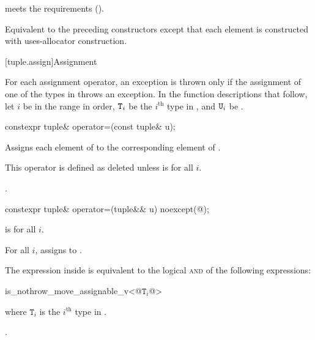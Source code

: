 \documentclass{wg21}
\begin{document}
\begin{itemdescr}
    \pnum
    \expects
     meets the
     requirements ().

    \pnum
    \effects
    Equivalent to the preceding constructors except that each element is constructed with
    uses-allocator construction.
\end{itemdescr}

[tuple.assign]{Assignment}

\pnum
For each  assignment operator, an exception is thrown only if the
assignment of one of the types in  throws an exception.
In the function descriptions that follow, let $i$ be in the range 
in order, $\texttt{T}_i$ be the $i^\text{th}$ type in ,
and $\texttt{U}_i$ be .

%
\begin{itemdecl}
    constexpr tuple& operator=(const tuple& u);
\end{itemdecl}

\begin{itemdescr}
    \pnum
    \effects
    Assigns each element of  to the corresponding
    element of .

    \pnum
    \remarks
    This operator is defined as deleted unless
     is  for all $i$.

    \pnum
    \returns
    .
\end{itemdescr}

%
\begin{itemdecl}
    constexpr tuple& operator=(tuple&& u) noexcept(@\seebelow@);
\end{itemdecl}

\begin{itemdescr}
    \pnum
    \constraints
     is  for all $i$.

    \pnum
    \effects
    For all $i$, assigns  to
    .

    \pnum
    \remarks
    The expression inside  is equivalent to the logical \textsc{and} of the
    following expressions:

    \begin{codeblock}
        is_nothrow_move_assignable_v<@$\mathtt{T}_i$@>
    \end{codeblock}
    where $\mathtt{T}_i$ is the $i^\text{th}$ type in .

    \pnum
    \returns
    .
\end{itemdescr}
\end{document}
